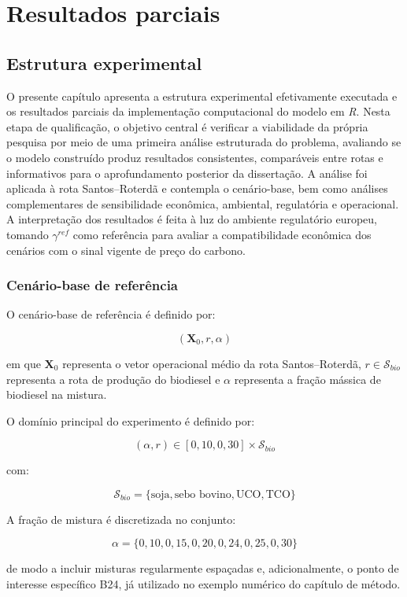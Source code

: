 \chapter{Resultados parciais}
\label{chap_resultados}

\section{Estrutura experimental}

O presente capítulo apresenta a estrutura experimental efetivamente executada e os resultados parciais da implementação computacional do modelo em \emph{R}. Nesta etapa de qualificação, o objetivo central é verificar a viabilidade da própria pesquisa por meio de uma primeira análise estruturada do problema, avaliando se o modelo construído produz resultados consistentes, comparáveis entre rotas e informativos para o aprofundamento posterior da dissertação. A análise foi aplicada à rota Santos--Roterdã e contempla o cenário-base, bem como análises complementares de sensibilidade econômica, ambiental, regulatória e operacional. A interpretação dos resultados é feita à luz do ambiente regulatório europeu, tomando $\gamma^{ref}$ como referência para avaliar a compatibilidade econômica dos cenários com o sinal vigente de preço do carbono.

\subsection{Cenário-base de referência}

O cenário-base de referência é definido por:

\[
(\mathbf{X}_0, r, \alpha)
\]

em que $\mathbf{X}_0$ representa o vetor operacional médio da rota Santos--Roterdã, $r \in \mathcal{S}_{bio}$ representa a rota de produção do biodiesel e $\alpha$ representa a fração mássica de biodiesel na mistura.

O domínio principal do experimento é definido por:

\[
(\alpha,r) \in [0{,}10,0{,}30] \times \mathcal{S}_{bio}
\]

com:

\[
\mathcal{S}_{bio} =
\{\text{soja},\text{sebo bovino},\text{UCO},\text{TCO}\}
\]

A fração de mistura é discretizada no conjunto:

\[
\alpha =
\{0{,}10,0{,}15,0{,}20,0{,}24,0{,}25,0{,}30\}
\]

de modo a incluir misturas regularmente espaçadas e, adicionalmente, o ponto de interesse específico \gls{B24}, já utilizado no exemplo numérico do capítulo de método.

